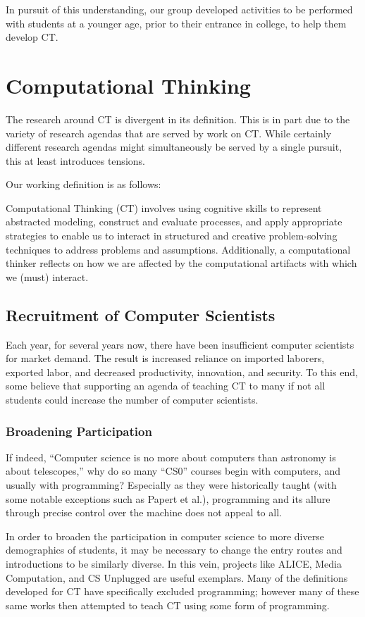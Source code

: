 \documentclass{acm_proc_article-sp}
\begin{document}
In pursuit of this understanding, our group developed activities to be performed with students at a younger age, prior to their entrance in college, to help them develop CT.


\section{Computational Thinking}
The research around CT is divergent in its definition. This is in part due to the variety of research agendas that are served by work on CT. While certainly different research agendas might simultaneously be served by a single pursuit, this at least introduces tensions. 

Our working definition is as follows:

Computational Thinking (CT) involves using cognitive skills to represent abstracted modeling, construct and evaluate processes, and apply appropriate strategies to enable us to interact in structured and creative problem-solving techniques to address problems and assumptions. Additionally, a computational thinker reflects on how we are affected by the computational artifacts with which we (must) interact.

\subsection{Recruitment of Computer Scientists}
Each year, for several years now, there have been insufficient computer scientists for market demand. The result is increased reliance on imported laborers, exported labor, and decreased productivity, innovation, and security. To this end, some believe that supporting an agenda of teaching CT to many if not all students could increase the number of computer scientists.

\subsubsection{Broadening Participation}
If indeed, “Computer science is no more about computers than astronomy is about telescopes,” why do so many “CS0” courses begin with computers, and usually with programming? Especially as they were historically taught (with some notable exceptions such as Papert et al.), programming and its allure through precise control over the machine does not appeal to all.

In order to broaden the participation in computer science to more diverse demographics of students, it may be necessary to change the entry routes and introductions to be similarly diverse. In this vein, projects like ALICE, Media Computation, and CS Unplugged are useful exemplars. Many of the definitions developed for CT have specifically excluded programming; however many of these same works then attempted to teach CT using some form of programming.
\end{document}
